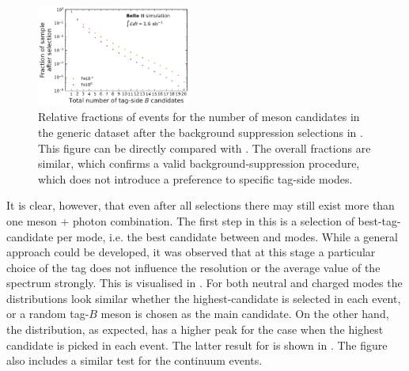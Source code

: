 \begin{figure}[htbp!]
    \centering
    \includegraphics[width=0.45\textwidth]{figures/event_reconstruction/Bboth_total_tag_candidates.pdf}
    \caption{\label{fig:fei_tag_reco_candidates_post_optimisation} 
    Relative fractions of events for the number of \B meson candidates in the generic \MC dataset after the background suppression selections in .
    This figure can be directly compared with .
    The overall fractions are similar, which confirms a valid background-suppression procedure, which does not introduce a preference to specific tag-side modes.
    }
\end{figure}

It is clear, however, that even after all selections there may still exist more than one \B meson + photon combination.
The first step in this is a selection of best-tag-candidate per \FEI mode, i.e. the best candidate between \feiBp and \feiBz modes.
While a general approach could be developed, it was observed that at this stage a particular choice of the tag does not influence the resolution or the average value of the spectrum strongly.
This is visualised in .
For both neutral and charged \BtoXsgamma modes the distributions look similar whether the highest-\feiProb candidate is selected in each event, or a random tag-$B$ meson is chosen as the main candidate.
On the other hand, the \Mbc distribution, as expected, has a higher peak for the case when the highest \feiProb candidate is picked in each event.
The latter result for \BtoXsgamma is shown in .
The figure also includes a similar \Mbc test for the continuum events.

